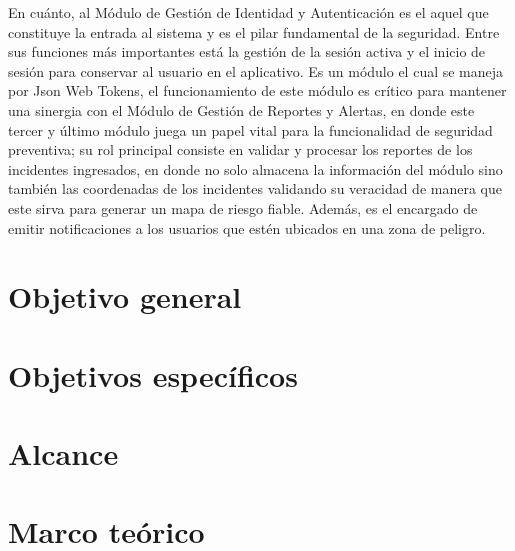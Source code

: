 En cuánto, al Módulo de Gestión de Identidad y Autenticación es el aquel que constituye la entrada al sistema y es el pilar fundamental de la seguridad. Entre sus funciones más importantes está la gestión de la sesión activa y el inicio de sesión para conservar al usuario en el aplicativo. Es un módulo el cual se maneja por Json Web Tokens, el funcionamiento de este módulo es crítico para mantener una sinergia con el Módulo de Gestión de Reportes y Alertas, en donde este tercer y último módulo juega un papel vital para la funcionalidad de seguridad preventiva; su rol principal consiste en validar y procesar los reportes de los incidentes ingresados, en donde no solo almacena la información del módulo sino también las coordenadas de los incidentes validando su veracidad de manera que este sirva para generar un mapa de riesgo fiable. Además, es el encargado de emitir notificaciones a los usuarios que estén ubicados en una zona de peligro.

\section{Objetivo general}
\label{chapter01-section01:Objetivo General}


\section{Objetivos específicos}
\label{chapter01-section02:Objetivos Específicos}


\section{Alcance}
\label{chapter01-section03:Alcance}


\section{Marco teórico}
\label{chapter01-section03:Marco teórico}
